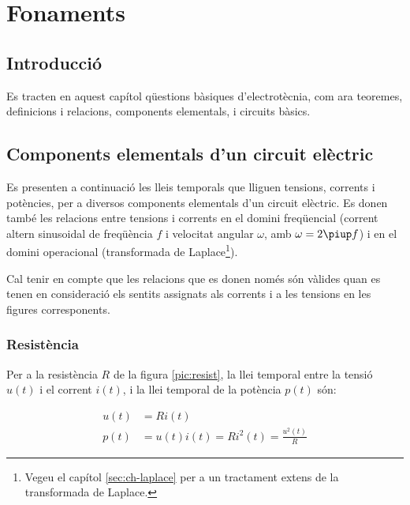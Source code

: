 \chapter{Fonaments}\label{ch:fonaments}

\section{Introducció}
Es tracten en aquest capítol qüestions bàsiques
d'electrotècnia, com ara teoremes, definicions i relacions, components elementals, i circuits bàsics.

\section{Components elementals d'un circuit elèctric}\label{sec:comp_elem}

Es presenten a continuació les lleis temporals que lliguen tensions,
corrents i potències, per a diversos components elementals d'un
circuit elèctric. Es donen també les relacions entre tensions i
corrents en el domini freqüencial (corrent altern sinusoidal de freqüència $f$ i velocitat angular $\omega$, amb
$\omega=2\piup f$) i en el domini operacional (transformada de
Laplace\footnote{Vegeu el capítol \ref{sec:ch-laplace} per a un tractament extens de la transformada de Laplace.}).

Cal tenir en compte que les relacions que es donen només són
vàlides  quan es tenen en consideració els sentits assignats als
corrents i a les tensions en les figures corresponents.

\subsection{Resistència} 

Per a la resistència $R$ de la figura
\vref{pic:resist}, la llei temporal entre la tensió $u(t)$ i el
corrent $i(t)$, i la llei temporal de la potència $p(t)$ són:


\hfill
\begin{minipage}[b]{5cm}
	
	\label{pic:resist}
\end{minipage}
\hfill
\begin{minipage}[b][3.25cm][t]{8cm}
	\begin{align}
		u(t) &= R i(t) \\  p(t) &= u(t) i(t) = R i^2(t) = \frac{u^2(t)}{R}
	\end{align}
\end{minipage}

